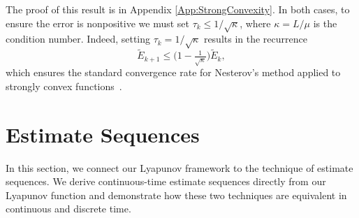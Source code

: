 \documentclass[11pt]{article}
\theoremstyle{plain}
\begin{document}
The proof of this result is in Appendix \ref{App:StrongConvexity}. In both cases, to ensure the error is nonpositive we must set  $\tau_k\leq 1/\sqrt{\kappa}$, where $\kappa = L/\mu$ is the condition number.  Indeed, setting $\tau_k = 1/\sqrt{\kappa}$ results in the recurrence
\[
\tilde E_{k+1} \leq \Big(1-\tfrac{1}{\sqrt{\kappa}}\Big) \tilde  E_k, 
\]
which ensures the standard convergence rate for Nesterov's method applied to strongly convex functions~\cite{Nesterov04}.

\section{Estimate Sequences}

In this section, we connect our Lyapunov framework to the technique of estimate sequences.  We derive continuous-time estimate sequences directly from our Lyapunov function and demonstrate how these two techniques are equivalent in continuous and discrete time.
\end{document}
